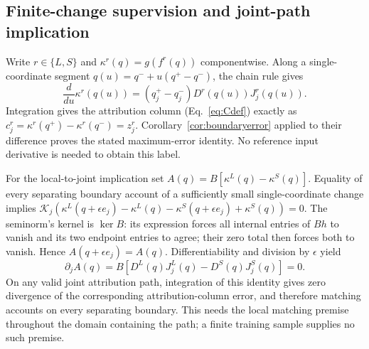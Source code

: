 \subsection{Finite-change supervision and joint-path implication}\label{app:pairproof}
\begin{pf}
Write $r\in\{L,S\}$ and $\kappa^r(q)=g(f^r(q))$ componentwise. Along a
single-coordinate segment $q(u)=q^-+u(q^+-q^-)$, the chain rule gives
\[
\frac{d}{du}\kappa^r(q(u))=(q_j^+-q_j^-)
D^r(q(u))J_j^r(q(u)).
\]
Integration gives the attribution column (Eq.~\eqref{eq:Cdef}) exactly
as $c_j^r=\kappa^r(q^+)-\kappa^r(q^-)=z_j^r$.
Corollary~\ref{cor:boundaryerror} applied to their difference proves
the stated maximum-error identity. No reference input derivative is
needed to obtain this label.

For the local-to-joint implication set
$A(q)=B[\kappa^L(q)-\kappa^S(q)]$. Equality of every separating boundary
account of a sufficiently small single-coordinate change implies
$\mathcal K_j(\kappa^L(q+\epsilon e_j)-\kappa^L(q)
-\kappa^S(q+\epsilon e_j)+\kappa^S(q))=0$.
The seminorm's kernel is $\ker B$: its expression forces all internal
entries of $Bh$ to vanish and its two endpoint entries to agree; their
zero total then forces both to vanish. Hence
$A(q+\epsilon e_j)=A(q)$. Differentiability and division by $\epsilon$
yield
\[
\partial_j A(q)=B[D^L(q)J_j^L(q)-D^S(q)J_j^S(q)]=0.
\]
On any valid joint attribution path, integration of this identity gives
zero divergence of the corresponding attribution-column error, and
therefore matching accounts on every separating boundary. This needs
the local matching premise throughout the domain containing the path;
a finite training sample supplies no such premise.
\end{pf}
